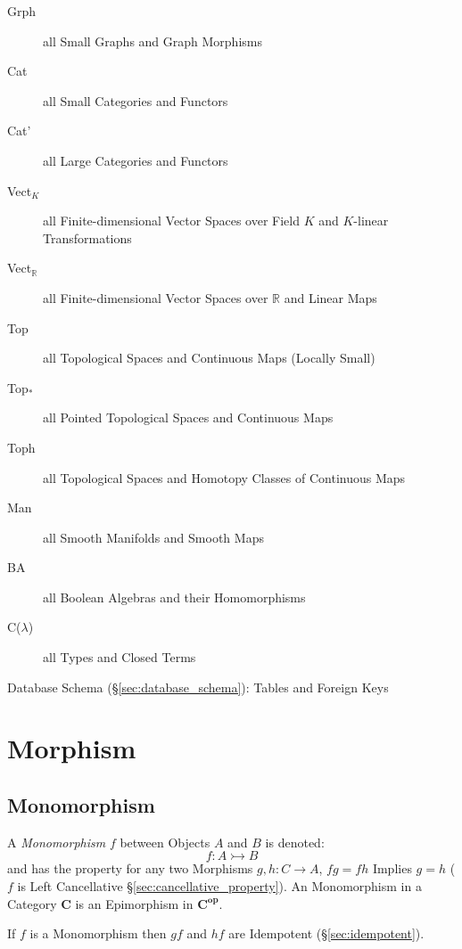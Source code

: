 \begin{description}
\item [Grph] all Small Graphs and Graph Morphisms
\item [Cat] all Small Categories and Functors
\item [Cat'] all Large Categories and Functors
\item [Vect$_K$] all Finite-dimensional Vector Spaces over Field $K$
  and $K$-linear Transformations
\item [Vect$_\mathbb{R}$] all Finite-dimensional Vector Spaces over
  $\mathbb{R}$ and Linear Maps
\item [Top] all Topological Spaces and Continuous Maps (Locally Small)
\item [Top$_*$] all Pointed Topological Spaces and Continuous Maps
\item [Toph] all Topological Spaces and Homotopy Classes of Continuous
  Maps
\item [Man] all Smooth Manifolds and Smooth Maps
\item [BA] all Boolean Algebras and their Homomorphisms
\item [C($\lambda$)] all Types and Closed Terms
\end{description}

Database Schema (\S\ref{sec:database_schema}): Tables and Foreign Keys



\section{Morphism}\label{sec:morphism}

\subsection{Monomorphism}\label{sec:monomorphism}

A \emph{Monomorphism} $f$ between Objects $A$ and $B$ is denoted:
\[
  f : A \rightarrowtail B
\]
and has the property for any two Morphisms $g, h : C \rightarrow A$,
$fg = fh$ Implies $g = h$ ($f$ is Left Cancellative
\S\ref{sec:cancellative_property}). An Monomorphism in a Category
$\mathbf{C}$ is an Epimorphism in $\mathbf{C^{op}}$.

If $f$ is a Monomorphism then $gf$ and $hf$ are Idempotent
(\S\ref{sec:idempotent}). %

